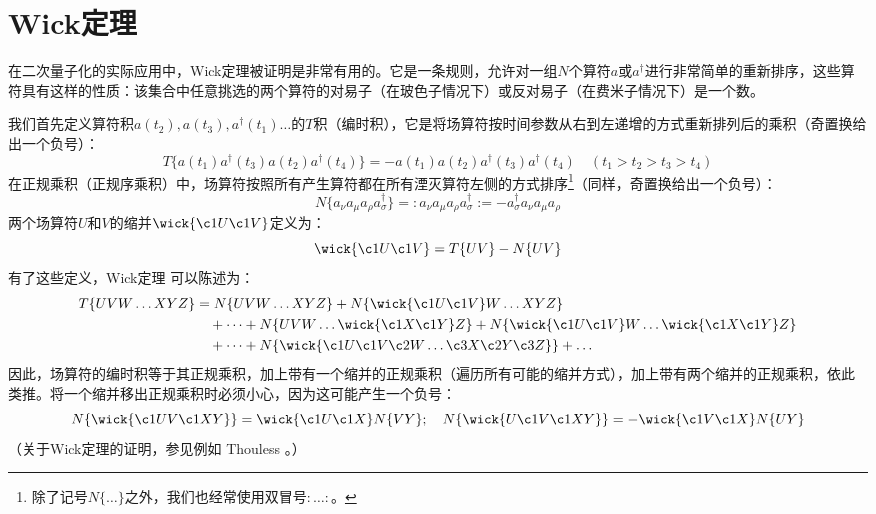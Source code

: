 \section{Wick定理}

在二次量子化的实际应用中，Wick定理被证明是非常有用的。它是一条规则，允许对一组$N$个算符$a$或$a^{\dagger}$进行非常简单的重新排序，这些算符具有这样的性质：该集合中任意挑选的两个算符的对易子（在玻色子情况下）或反对易子（在费米子情况下）是一个数。

我们首先定义算符积$a(t_{2}),a(t_{3}),a^{\dagger}(t_{1})\dots$的$T$积（编时积），它是将场算符按时间参数从右到左递增的方式重新排列后的乘积（奇置换给出一个负号）：
\begin{equation}
T\{a(t_{1})a^{\dagger}(t_{3})a(t_{2})a^{\dagger}(t_{4})\}=-a(t_{1})a(t_{2})a^{\dagger}(t_{3})a^{\dagger}(t_{4})\quad(t_{1}>t_{2}>t_{3}>t_{4})\label{eq:appendix_c_t_product_example}
\end{equation}
在正规乘积（正规序乘积）中，场算符按照所有产生算符都在所有湮灭算符左侧的方式排序\footnote{除了记号$N\{\dots\}$之外，我们也经常使用双冒号$:\dots:$。}（同样，奇置换给出一个负号）：
\begin{equation}
N\{a_{\nu}a_{\mu}a_{\rho}a^{\dagger}_{\sigma}\}=:\!a_{\nu}a_{\mu}a_{\rho}a^{\dagger}_{\sigma}\!:=-a^{\dagger}_{\sigma}a_{\nu}a_{\mu}a_{\rho}\label{eq:appendix_c_normal_order_example}
\end{equation}
两个场算符$U$和$V$的缩并$\wick{\c1{U}\c1{V}}$定义为：
\begin{equation}
\wick{\c1{U}\c1{V}}=T\{UV\}-N\{UV\}\label{eq:appendix_c_contraction_def}
\end{equation}
有了这些定义，Wick定理 \cite{Wi50} 可以陈述为：
\begin{align}
T\{UVW\dots XYZ\} & =N\{UVW\dots XYZ\}+N\{\wick{\c1{U}\c1{V}}W\dots XYZ\}\nonumber \\
 & \quad+\dots+N\{UVW\dots\wick{\c1{X}\c1{Y}}Z\}+N\{\wick{\c1{U}\c1{V}}W\dots\wick{\c1{X}\c1{Y}}Z\}\nonumber \\
 & \quad+\dots+N\{\wick{\c1{U}\c1{V}\c2{W}\dots\c3{X}\c2{Y}\c3{Z}}\}+\dots\label{eq:appendix_c_wick_theorem}
\end{align}
因此，场算符的编时积等于其正规乘积，加上带有一个缩并的正规乘积（遍历所有可能的缩并方式），加上带有两个缩并的正规乘积，依此类推。将一个缩并移出正规乘积时必须小心，因为这可能产生一个负号：
\begin{equation}
N\{\wick{\c1{U}V\c1{X}Y}\}=\wick{\c1{U}\c1{X}}N\{VY\};\quad N\{\wick{U\c1{V}\c1{X}Y}\}=-\wick{\c1{V}\c1{X}}N\{UY\}\label{eq:appendix_c_contraction_sign}
\end{equation}
（关于Wick定理的证明，参见例如 Thouless \cite{Th61b}。）

